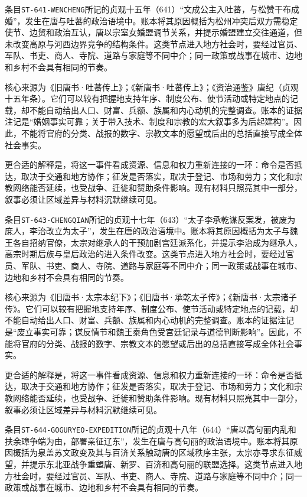 条目\texttt{ST-641-WENCHENG}所记的贞观十五年（641）“文成公主入吐蕃，与松赞干布成婚”，发生在唐与吐蕃的政治语境中。账本将其原因概括为松州冲突后双方需稳定使节、边贸和政治互认，唐以宗室女婚盟调节关系，并提示婚盟建立交往通道，但未改变高原与河西边界竞争的结构条件。这类节点进入地方社会时，要经过官员、军队、书吏、商人、寺院、道路与家庭等不同中介；同一政策或战事在城市、边地和乡村不会具有相同的节奏。

核心来源为《旧唐书·吐蕃传上》；《新唐书·吐蕃传上》；《资治通鉴》唐纪（贞观十五年条）。它们可以较有把握地支持年序、制度公布、使节活动或特定地点的记载，却不能自动给出人口、财富、兵额、族属和内心动机的完整调查。账本的证据注记是“婚姻事实可靠；关于带入技术、制度和宗教的宏大叙事多为后起建构”。因此，不能将官府的分类、战报的数字、宗教文本的愿望或后出的总括直接写成全体社会事实。

更合适的解释是，将这一事件看成资源、信息和权力重新连接的一环：命令是否抵达，取决于交通和地方协作；征发是否落实，取决于登记、市场和劳力；文化和宗教网络能否延续，也受战争、迁徙和赞助条件影响。现有材料只照亮其中一部分，叙事必须让区域差异与材料沉默继续可见。

条目\texttt{ST-643-CHENGQIAN}所记的贞观十七年（643）“太子李承乾谋反案发，被废为庶人，李治改立为太子”，发生在唐的政治语境中。账本将其原因概括为太子与魏王各自招纳官僚，太宗对继承人的干预加剧宫廷派系化，并提示李治成为继承人，高宗时期后族与皇后政治的进入条件改变。这类节点进入地方社会时，要经过官员、军队、书吏、商人、寺院、道路与家庭等不同中介；同一政策或战事在城市、边地和乡村不会具有相同的节奏。

核心来源为《旧唐书·太宗本纪下》；《旧唐书·承乾太子传》；《新唐书·太宗诸子传》。它们可以较有把握地支持年序、制度公布、使节活动或特定地点的记载，却不能自动给出人口、财富、兵额、族属和内心动机的完整调查。账本的证据注记是“废立事实可靠；谋反情节和魏王泰角色受宫廷记录与道德判断影响”。因此，不能将官府的分类、战报的数字、宗教文本的愿望或后出的总括直接写成全体社会事实。

更合适的解释是，将这一事件看成资源、信息和权力重新连接的一环：命令是否抵达，取决于交通和地方协作；征发是否落实，取决于登记、市场和劳力；文化和宗教网络能否延续，也受战争、迁徙和赞助条件影响。现有材料只照亮其中一部分，叙事必须让区域差异与材料沉默继续可见。

条目\texttt{ST-644-GOGURYEO-EXPEDITION}所记的贞观十八年（644）“唐以高句丽内乱和扶余璋争端为由，部署亲征辽东”，发生在唐与高句丽的政治语境中。账本将其原因概括为泉盖苏文政变及其与百济关系触动唐的区域秩序主张，太宗亦寻求东征威望，并提示东北亚战争重塑唐、新罗、百济和高句丽的联盟选择。这类节点进入地方社会时，要经过官员、军队、书吏、商人、寺院、道路与家庭等不同中介；同一政策或战事在城市、边地和乡村不会具有相同的节奏。

